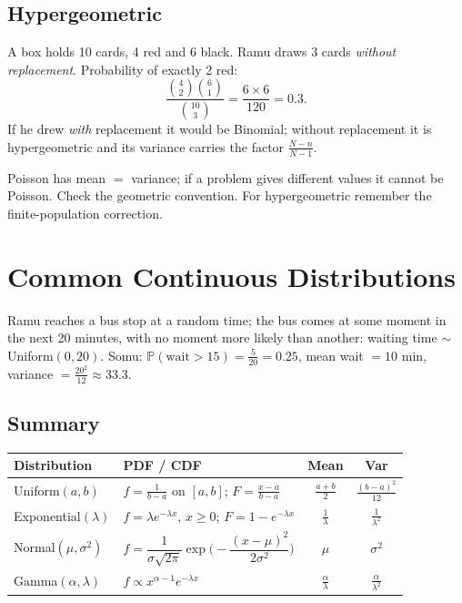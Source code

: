\documentclass[11pt,a4paper]{article}
\renewcommand{\Pr}{\mathbb{P}}
\begin{document}
\subsection{Hypergeometric}
\begin{story}
A box holds 10 cards, 4 red and 6 black. Ramu draws 3 cards \emph{without replacement}. Probability of exactly 2 red:
\[
\frac{\binom42\binom61}{\binom{10}{3}}=\frac{6\times6}{120}=0.3 .
\]
If he drew \emph{with} replacement it would be Binomial; without replacement it is hypergeometric and its variance carries the factor $\frac{N-n}{N-1}$.
\end{story}

\begin{trap}
Poisson has mean $=$ variance; if a problem gives different values it cannot be Poisson. Check the geometric convention. For hypergeometric remember the finite-population correction.
\end{trap}

\newpage
\section{Common Continuous Distributions}

\begin{story}
Ramu reaches a bus stop at a random time; the bus comes at some moment in the next 20 minutes, with no moment more likely than another: waiting time $\sim$ Uniform$(0,20)$. Somu: $\Pr(\text{wait}>15)=\frac{5}{20}=0.25$, mean wait $=10$ min, variance $=\frac{20^2}{12}\approx33.3$.
\end{story}

\subsection{Summary}
\begin{center}
\begin{tabularx}{\textwidth}{>{\raggedright\arraybackslash}p{3.4cm} >{\raggedright\arraybackslash}X c c}
\toprule
\textbf{Distribution} & \textbf{PDF / CDF} & \textbf{Mean} & \textbf{Var}\\
\midrule
Uniform$(a,b)$ & $f=\frac1{b-a}$ on $[a,b]$; $F=\frac{x-a}{b-a}$ & $\frac{a+b}2$ & $\frac{(b-a)^2}{12}$\\
Exponential$(\lambda)$ & $f=\lambda e^{-\lambda x}$, $x\ge0$; $F=1-e^{-\lambda x}$ & $\frac1\lambda$ & $\frac1{\lambda^2}$\\
Normal$(\mu,\sigma^2)$ & $f=\dfrac{1}{\sigma\sqrt{2\pi}}\exp\!\Big(-\dfrac{(x-\mu)^2}{2\sigma^2}\Big)$ & $\mu$ & $\sigma^2$\\
Gamma$(\alpha,\lambda)$ & $f\propto x^{\alpha-1}e^{-\lambda x}$ & $\frac\alpha\lambda$ & $\frac\alpha{\lambda^2}$\\
\bottomrule
\end{tabularx}
\end{center}
\end{document}
